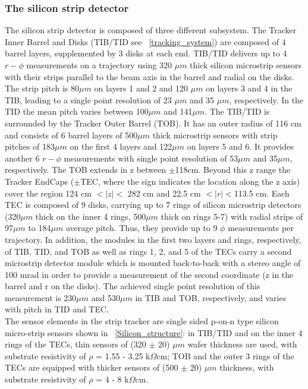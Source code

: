 \subsubsection{The silicon strip detector}
The silicon strip detector is composed of three different subsystem. The Tracker Inner Barrel and Disks (TIB/TID  see \figurename~\ref{tracking_system}) are composed of 4 barrel layers, supplemented by 3 disks at each end. TIB/TID delivers up to 4 $r-\phi$ measurements on a trajectory using 320 $\mu m$ thick silicon microstrip sensors with their strips parallel to the beam axis in the barrel and radial on the disks. The strip pitch is 80$\mu m$ on layers 1 and 2 and 120 $\mu m$ on layers 3 and 4 in the TIB, leading to a single point resolution of 23 $\mu m$ and 35 $\mu m$, respectively. In the TID the mean pitch varies between 100$\mu m$ and 141$\mu m$. The TIB/TID is surrounded by the Tracker Outer Barrel (TOB). It has an outer radius of 116 cm and consists of 6 barrel layers of 500$\mu m$ thick microstrip sensors with strip pitches of 183$\mu m$ on the first 4 layers and 122$\mu m$ on layers 5 and 6. It provides another 6 $r-\phi$ measurements with single point resolution of 53$\mu m$ and 35$\mu m$, respectively. The TOB extends in z between $\pm$118cm. Beyond this z range the Tracker EndCaps ($\pm$TEC, where the sign indicates the location along the z axis) cover the region 124 cm $< |z| <$ 282 cm and 22.5 cm $< |r| < $113.5 cm. Each TEC is composed of 9 disks, carrying up to 7 rings of silicon microstrip detectors (320$\mu m$ thick on the inner 4 rings, 500$\mu m$ thick on rings 5-7) with radial strips of 97$\mu m$ to 184$\mu m$ average pitch. Thus, they provide up to 9 $\phi$ measurements per trajectory. In addition, the modules in the first two layers and rings, respectively, of TIB, TID, and TOB as well as rings 1, 2, and 5 of the TECs carry a second microstrip detector module which is mounted back-to-back with a stereo angle of 100 mrad in order to provide a measurement of the second coordinate (z in the barrel and r on the disks). The achieved single point resolution of this measurement is 230$\mu m$ and 530$\mu m$ in TIB and TOB, respectively, and varies with pitch in TID and TEC. \\
The sensor elements in the strip tracker are single sided p-on-n type silicon micro-strip sensors shown in \figurename~\ref{Silicon_structure}: in TIB/TID and on the inner 4 rings of the TECs, thin sensors of (320 $\pm$ 20) $\mu m$ wafer thickness are used, with substrate resistivity of $\rho$ = 1.55 - 3.25 k$\Omega$cm; TOB and the outer 3 rings of the TECs are equipped with thicker sensors of (500 $\pm$ 20) $\mu m$ thickness, with substrate resistivity of $\rho$ = 4 - 8 k$\Omega$cm. 
